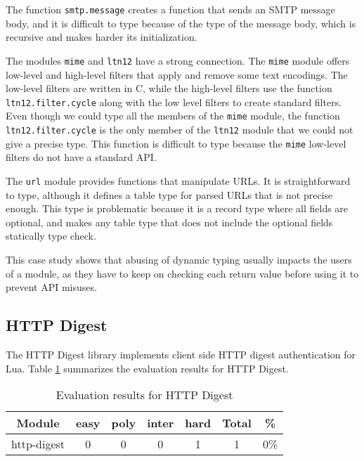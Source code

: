 The function \texttt{smtp.message} creates a function that sends
an SMTP message body, and it is difficult to type because of the
type of the message body, which is recursive and makes harder
its initialization.

The modules \texttt{mime} and \texttt{ltn12} have a strong connection.
The \texttt{mime} module offers low-level and high-level filters
that apply and remove some text encodings.
The low-level filters are written in C, while the high-level filters
use the function \texttt{ltn12.filter.cycle} along with the low level
filters to create standard filters.
Even though we could type all the members of the \texttt{mime} module,
the function \texttt{ltn12.filter.cycle} is the only member of the
\texttt{ltn12} module that we could not give a precise type.
This function is difficult to type because the \texttt{mime} low-level
filters do not have a standard API.

The \texttt{url} module provides functions that manipulate URLs.
It is straightforward to type, although it defines a table type for
parsed URLs that is not precise enough.
This type is problematic because it is a record type where all
fields are optional, and makes any table type that does not include
the optional fields statically type check.

This case study shows that abusing of dynamic typing usually impacts
the users of a module, as they have to keep on checking each return
value before using it to prevent API misuses.

\subsection{HTTP Digest}

The HTTP Digest library implements client side HTTP digest authentication for Lua.
Table \ref{tab:evalhttpdigest} summarizes the evaluation results for HTTP Digest.

\begin{table}[!ht]
\begin{center}
\begin{tabular}{|c|c|c|c|c|c|c|}
\hline
\textbf{Module} & \textbf{easy} & \textbf{poly} & \textbf{inter} & \textbf{hard} & \textbf{Total} & \textbf{\%} \\
\hline
http-digest & 0 & 0 & 0 & 1 & 1 & 0\% \\
\hline
\end{tabular}
\end{center}
\caption{Evaluation results for HTTP Digest}
\label{tab:evalhttpdigest}
\end{table}

